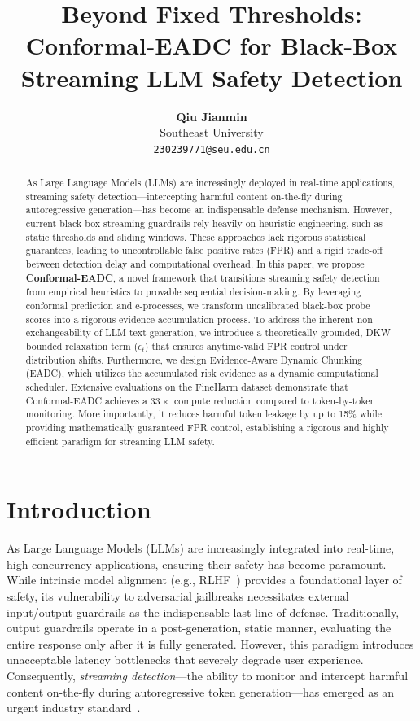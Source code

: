 \documentclass[letterpaper,twocolumn,10pt]{article}
\title{\LARGE\bfseries Beyond Fixed Thresholds: Conformal-EADC for Black-Box Streaming LLM Safety Detection}
\author{
  \textbf{Qiu Jianmin}\\
  Southeast University\\
  \texttt{230239771@seu.edu.cn}
}
\date{}
\begin{document}
\maketitle

\begin{abstract}
As Large Language Models (LLMs) are increasingly deployed in real-time applications, streaming safety detection---intercepting harmful content on-the-fly during autoregressive generation---has become an indispensable defense mechanism.
However, current black-box streaming guardrails rely heavily on heuristic engineering, such as static thresholds and sliding windows.
These approaches lack rigorous statistical guarantees, leading to uncontrollable false positive rates (FPR) and a rigid trade-off between detection delay and computational overhead.
In this paper, we propose \textbf{Conformal-EADC}, a novel framework that transitions streaming safety detection from empirical heuristics to provable sequential decision-making.
By leveraging conformal prediction and e-processes, we transform uncalibrated black-box probe scores into a rigorous evidence accumulation process.
To address the inherent non-exchangeability of LLM text generation, we introduce a theoretically grounded, DKW-bounded relaxation term ($\epsilon_t$) that ensures anytime-valid FPR control under distribution shifts.
Furthermore, we design Evidence-Aware Dynamic Chunking (EADC), which utilizes the accumulated risk evidence as a dynamic computational scheduler.
Extensive evaluations on the FineHarm dataset demonstrate that Conformal-EADC achieves a $33\times$ compute reduction compared to token-by-token monitoring.
More importantly, it reduces harmful token leakage by up to 15\% while providing mathematically guaranteed FPR control, establishing a rigorous and highly efficient paradigm for streaming LLM safety.
\end{abstract}

\section{Introduction}
\label{sec:intro}

As Large Language Models (LLMs) are increasingly integrated into real-time, high-concurrency applications, ensuring their safety has become paramount.
While intrinsic model alignment (e.g., RLHF~\cite{ouyang2022training}) provides a foundational layer of safety, its vulnerability to adversarial jailbreaks necessitates external input/output guardrails as the indispensable last line of defense.
Traditionally, output guardrails operate in a post-generation, static manner, evaluating the entire response only after it is fully generated.
However, this paradigm introduces unacceptable latency bottlenecks that severely degrade user experience.
Consequently, \emph{streaming detection}---the ability to monitor and intercept harmful content on-the-fly during autoregressive token generation---has emerged as an urgent industry standard~\cite{scm2024streaming}.
\end{document}

